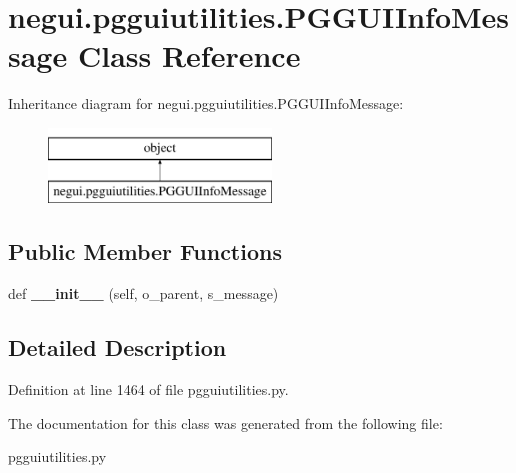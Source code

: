 \hypertarget{classnegui_1_1pgguiutilities_1_1PGGUIInfoMessage}{}\section{negui.\+pgguiutilities.\+P\+G\+G\+U\+I\+Info\+Message Class Reference}
\label{classnegui_1_1pgguiutilities_1_1PGGUIInfoMessage}
Inheritance diagram for negui.\+pgguiutilities.\+P\+G\+G\+U\+I\+Info\+Message\+:\begin{figure}[H]
\begin{center}
\leavevmode
\includegraphics[height=2.000000cm]{classnegui_1_1pgguiutilities_1_1PGGUIInfoMessage}
\end{center}
\end{figure}
\subsection*{Public Member Functions}
\begin{DoxyCompactItemize}
\item 
def {\bfseries \+\_\+\+\_\+init\+\_\+\+\_\+} (self, o\+\_\+parent, s\+\_\+message)\hypertarget{classnegui_1_1pgguiutilities_1_1PGGUIInfoMessage_a6610dd669862924d49f1ec400b4df128}{}\label{classnegui_1_1pgguiutilities_1_1PGGUIInfoMessage_a6610dd669862924d49f1ec400b4df128}

\end{DoxyCompactItemize}


\subsection{Detailed Description}


Definition at line 1464 of file pgguiutilities.\+py.



The documentation for this class was generated from the following file\+:\begin{DoxyCompactItemize}
\item 
pgguiutilities.\+py\end{DoxyCompactItemize}
